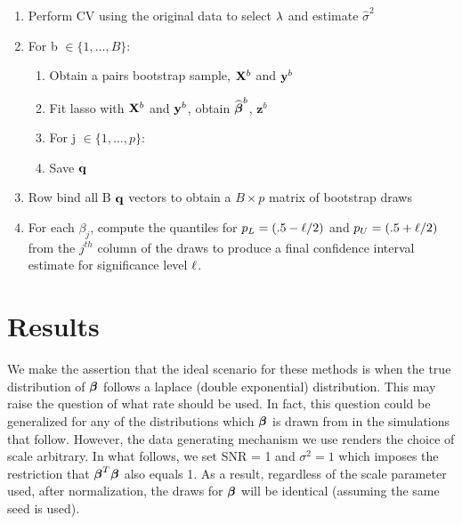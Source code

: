\begin{enumerate}
\item Perform CV using the original data to select $\lambda$ and estimate $\hat{\sigma}^2$
\item For b $\in \lbrace 1, \ldots, B \rbrace$:
\begin{enumerate}
\item Obtain a pairs bootstrap sample, $\mathbf{X}^b$ and $\mathbf{y}^b$
\item Fit lasso with $\mathbf{X}^b$ and $\mathbf{y}^b$, obtain $\widehat{\boldsymbol{\beta}}^b$, $\boldsymbol{z}^b$
\item For j $\in \lbrace 1, \ldots, p \rbrace$:
	\begin{algorithmic}
    \EndCase
    \EndCase
    \EndCase
    \EndCase
	\EndSwitch 
	\end{algorithmic}
\item Save $\mathbf{q}$
\end{enumerate}
\item Row bind all B $\mathbf{q}$ vectors to obtain a $B \times p$ matrix of bootstrap draws
\item For each $\beta_j$, compute the quantiles for $p_L = (.5 - \ell/2)$ and $p_U = (.5 + \ell/2)$ from the $j^{th}$ column of the draws to produce a final confidence interval estimate for significance level $\ell$.
\end{enumerate}

\section{Results}

We make the assertion that the ideal scenario for these methods is when the true distribution of $\boldsymbol{\beta}$ follows a laplace (double exponential) distribution. This may raise the question of what rate should be used. In fact, this question could be generalized for any of the distributions which $\boldsymbol{\beta}$ is drawn from in the simulations that follow. However, the data generating mechanism we use renders the choice of scale arbitrary. In what follows, we set SNR = 1 and $\sigma^2 = 1$ which imposes the restriction that $\boldsymbol{\beta}^T\boldsymbol{\beta}$ also equals 1. As a result, regardless of the scale parameter used, after normalization, the draws for $\boldsymbol{\beta}$ will be identical (assuming the same seed is used). 

